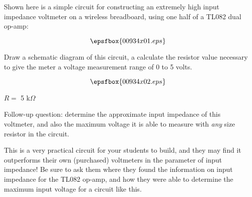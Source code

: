 

Shown here is a simple circuit for constructing an extremely high input impedance voltmeter on a wireless breadboard, using one half of a TL082 dual op-amp:

$$\epsfbox{00934x01.eps}$$

Draw a schematic diagram of this circuit, a calculate the resistor value necessary to give the meter a voltage measurement range of 0 to 5 volts.







$$\epsfbox{00934x02.eps}$$

$R =$ 5 k$\Omega$

\vskip 10pt

Follow-up question: determine the approximate input impedance of this voltmeter, and also the maximum voltage it is able to measure with {\it any} size resistor in the circuit.







This is a very practical circuit for your students to build, and they may find it outperforms their own (purchased) voltmeters in the parameter of input impedance!  Be sure to ask them where they found the information on input impedance for the TL082 op-amp, and how they were able to determine the maximum input voltage for a circuit like this.




